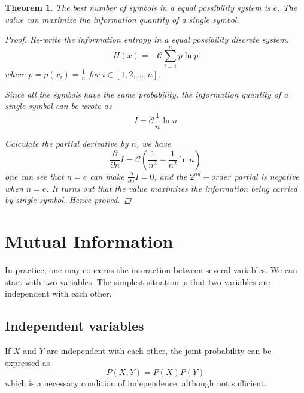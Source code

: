 \documentclass[a4paper]{article}
\newtheorem{theorem}{Theorem}[section]
\begin{document}
\begin{theorem}
    The best number of symbols in a equal possibility system is $e$.
    The value can maximize the information quantity of a single symbol.

    \begin{proof}
        Re-write the information entropy in a equal possibility discrete system.
        \begin{equation*}
            H(x) = - \mathcal{C} \sum_{i=1}^{n} p \ln{p}
        \end{equation*}
        where $p = p(x_{i}) = \frac{1}{n}$ for $i \in [1, 2, \dots, n]$.

        Since all the symbols have the same probability, the information quantity of a single symbol can be wrote as
        \begin{equation*}
            I = \mathcal{C} \frac{1}{n} \ln{n}
        \end{equation*}

        Calculate the partial derivative by $n$, we have
        \begin{equation*}
            \frac{\partial}{\partial{n}} I = \mathcal{C} (\frac{1}{n^{2}} - \frac{1}{n^{2}} \ln{n})
        \end{equation*}
        one can see that $n=e$ can make $\frac{\partial}{\partial{n}} I = 0$, and the $2^{nd}-order$ partial is negative when $n=e$.
        It turns out that the value maximizes the information being carried by single symbol.
        Hence proved.
    \end{proof}

\end{theorem}

\section{Mutual Information}

In practice, one may concerns the interaction between several variables.
We can start with two variables.
The simplest situation is that two variables are independent with each other.

\subsection{Independent variables}

If $X$ and $Y$ are independent with each other, the joint probability can be expressed as
\begin{equation}
    P(X, Y) = P(X) P(Y)
    \label{eq: Joint Probability of Independent Variables}
\end{equation}
which is a necessary condition of independence, although not sufficient.
\end{document}
